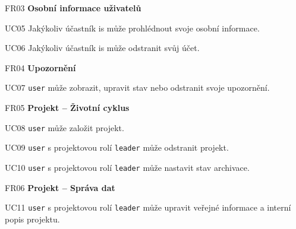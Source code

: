 \begin{dlnar}
   \item[FR03] \textbf{Osobní informace uživatelů}
 
   \begin{dlnar}
      \item[UC05] 
      Jakýkoliv účastník \gls{is} může prohlédnout svoje osobní informace. 

      \item[UC06] 
      Jakýkoliv účastník \gls{is} může odstranit svůj účet.
   \end{dlnar}
\end{dlnar}


\begin{dlnar}
   \item[FR04] \textbf{Upozornění}
 
   \begin{dlnar}
      \item[UC07] 
      \texttt{user} může zobrazit, upravit stav nebo odstranit svoje upozornění.
   \end{dlnar}
\end{dlnar}


\begin{dlnar}
   \item[FR05] \textbf{Projekt -- Životní cyklus}
   
   \begin{dlnar}
      \item[UC08]
      \texttt{user} může založit projekt. 

      \item[UC09]
      \texttt{user} s projektovou rolí \texttt{leader} může odstranit projekt. 

      \item[UC10]
      \texttt{user} s projektovou rolí \texttt{leader} může nastavit stav archivace.
   \end{dlnar}
\end{dlnar}


\begin{dlnar}
   \item[FR06] \textbf{Projekt -- Správa dat}
   
   \begin{dlnar}
      \item[UC11]
      \texttt{user} s projektovou rolí \texttt{leader} může upravit veřejné informace a interní popis projektu.
   \end{dlnar}
\end{dlnar}


